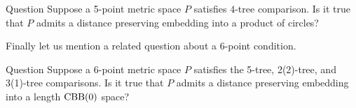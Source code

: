 \documentclass{article}
\begin{document}
\begin{thm}{Question}
Suppose a 5-point metric space $P$ satisfies $4$-tree comparison.
Is it true that $P$ admits a distance preserving embedding into a product of circles?
\end{thm}

Finally let us mention a related question about a 6-point condition. 

\begin{thm}{Question}
Suppose a 6-point metric space $P$ satisfies the 5-tree, 2(2)-tree, and 3(1)-tree comparisons.
Is it true that $P$ admits a distance preserving embedding into a length $\mathrm{CBB}(0)$ space?
\end{thm}

{\sloppy
\printbibliography[heading=bibintoc]
\fussy
}
\end{document}
